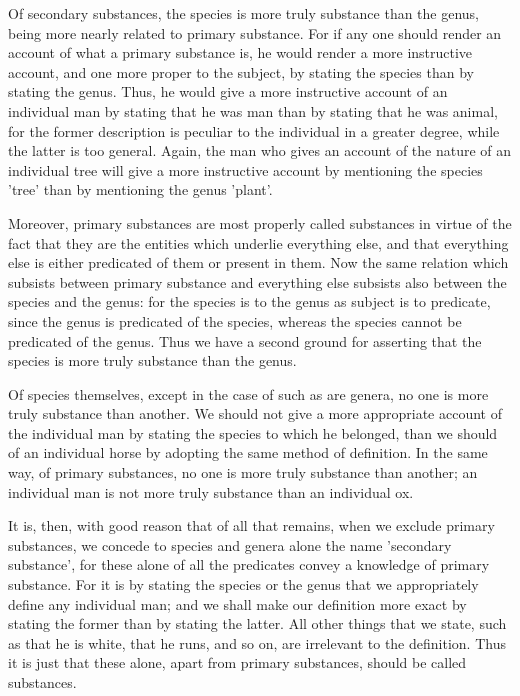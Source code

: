 Of secondary substances, the species is more truly substance than the
genus, being more nearly related to primary substance. For if any one
should render an account of what a primary substance is, he would
render a more instructive account, and one more proper to the subject,
by stating the species than by stating the genus. Thus, he would give a
more instructive account of an individual man by stating that he was
man than by stating that he was animal, for the former description is
peculiar to the individual in a greater degree, while the latter is too
general. Again, the man who gives an account of the nature of an
individual tree will give a more instructive account by mentioning the
species 'tree' than by mentioning the genus 'plant'.

Moreover, primary substances are most properly called substances in
virtue of the fact that they are the entities which underlie everything
else, and that everything else is either predicated of them or present
in them. Now the same relation which subsists between primary substance
and everything else subsists also between the species and the genus:
for the species is to the genus as subject is to predicate, since the
genus is predicated of the species, whereas the species cannot be
predicated of the genus. Thus we have a second ground for asserting
that the species is more truly substance than the genus.

Of species themselves, except in the case of such as are genera, no one
is more truly substance than another. We should not give a more
appropriate account of the individual man by stating the species to
which he belonged, than we should of an individual horse by adopting
the same method of definition. In the same way, of primary substances,
no one is more truly substance than another; an individual man is not
more truly substance than an individual ox.

It is, then, with good reason that of all that remains, when we exclude
primary substances, we concede to species and genera alone the name
'secondary substance', for these alone of all the predicates convey a
knowledge of primary substance. For it is by stating the species or the
genus that we appropriately define any individual man; and we shall
make our definition more exact by stating the former than by stating
the latter. All other things that we state, such as that he is white,
that he runs, and so on, are irrelevant to the definition. Thus it is
just that these alone, apart from primary substances, should be called
substances.

